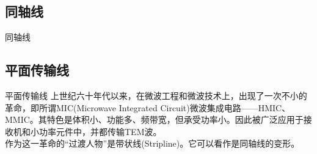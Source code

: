 \subsection{同轴线}
\begin{frame}{同轴线}

\end{frame}

\subsection{平面传输线}
\begin{frame}{平面传输线}
    上世纪六十年代以来，在微波工程和微波技术上，出现了一次不小的革命，即所谓MIC(Microwave Integrated Circuit)微波集成电路——HMIC、MMIC。其特色是体积小、功能多、频带宽，但承受功率小。因此被广泛应用于接收机和小功率元件中，并都传输TEM波。\\
    作为这一革命的“过渡人物”是带状线(Stripline)。它可以看作是同轴线的变形。
\end{frame}






